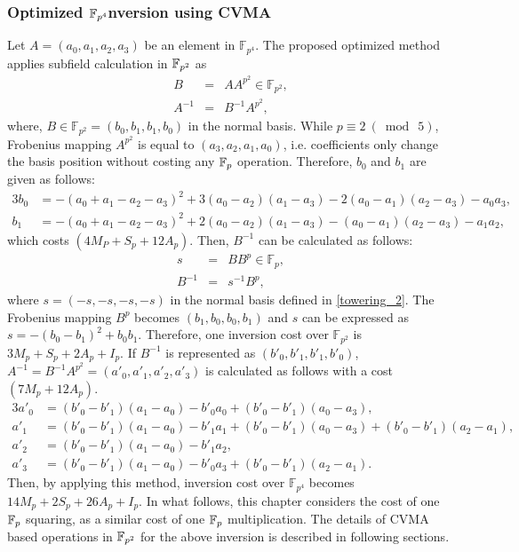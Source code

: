 \subsubsection{Optimized  \texorpdfstring{$\mathbb{F}_{p^4}$} Inversion using CVMA}
Let $A=(a_0,a_1,a_2,a_3)$ be an element in $\mathbb{F}_{p^4}$.
The proposed optimized method applies subfield calculation in $\mathbb{F}_{p^2}$ as 
\begin{eqnarray}
B&=&AA^{p^2} \in \mathbb{F}_{p^2}, \nonumber \\
A^{-1}&=&B^{-1}A^{p^2}, \nonumber
\end{eqnarray}
where, $B \in \mathbb{F}_{p^2} = (b_0,b_1,b_1,b_0)$ in the normal basis.
While $p \equiv 2~(\bmod~5)$,  Frobenius mapping $A^{p^2}$ is equal to $(a_3,a_2,a_1,a_0)$, i.e. coefficients only change the basis position without costing any ${\mathbb{F}}_{p}$ operation.
Therefore, $b_0$ and $b_1$ are given as follows: 
\begin{alignat}{3}
b_0 &=-(a_0+a_1-a_2-a_3)^2+3(a_0-a_2)(a_1-a_3)-2(a_0-a_1)(a_2-a_3)-a_0a_3, \nonumber \\
b_1 &=-(a_0+a_1-a_2-a_3)^2+2(a_0-a_2)(a_1-a_3) -(a_0-a_1)(a_2-a_3)-a_1a_2, \nonumber
\end{alignat}
which costs $(4M_P+S_p+12A_p)$.
Then, $B^{-1}$ can be calculated as follows:
\begin{eqnarray}
s&=&BB^{p} \in \mathbb{F}_p, \nonumber \\
B^{-1}&=&s^{-1}B^{p}, \nonumber
\end{eqnarray}
where $s = (-s,-s,-s,-s)$ in the normal basis defined in \eqref{towering_2}.
The Frobenius mapping $B^{p}$ becomes $(b_1,b_0,b_0,b_1)$ and $s$ can be expressed as $s=-(b_0-b_1)^2+b_0b_1$.
Therefore, one inversion cost over $\mathbb{F}_{p^2}$ is $3M_p+S_p+2A_p+I_p$.
If $B^{-1}$ is represented as $(b'_0,b'_1,b'_1,b'_0)$, $A^{-1}=B^{-1}A^{p^2}=(a'_0,a'_1,a'_2,a'_3)$ is calculated as follows with a cost $(7M_p+12A_p)$.
\begin{alignat}{3}
a'_0 &= (b'_0-b'_1)(a_1-a_0)-b'_0a_0+(b'_0-b'_1)(a_0-a_3), \nonumber \\
a'_1 &=(b'_0-b'_1)(a_1-a_0)-b'_1a_1+(b'_0-b'_1)(a_0-a_3)+(b'_0-b'_1)(a_2-a_1), \nonumber \\
a'_2 &= (b'_0-b'_1)(a_1-a_0)-b'_1a_2, \nonumber \\
a'_3 &=(b'_0-b'_1)(a_1-a_0)-b'_0a_3+(b'_0-b'_1)(a_2-a_1). \nonumber
\end{alignat}
Then, by applying this method, inversion cost over $\mathbb{F}_{p^4}$ becomes $14M_p+2S_p+26A_p+I_p$. 
In what follows, this chapter considers the cost of one $\mathbb{F}_p$ squaring, as a similar cost of one $\mathbb{F}_p$ multiplication.
The details of CVMA based operations in $\mathbb{F}_{p^2}$ for the above inversion is described in following sections.

